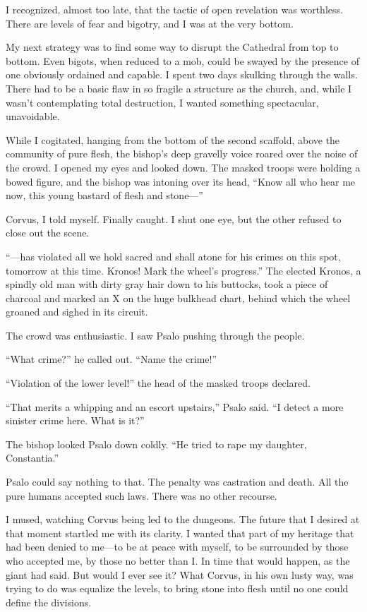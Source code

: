 I recognized, almost too late, that the tactic of open revelation was worthless. There are levels of fear and bigotry, and I was at the very bottom.

My next strategy was to find some way to disrupt the Cathedral from top to bottom. Even bigots, when reduced to a mob, could be swayed by the presence of one obviously ordained and capable. I spent two days skulking through the walls. There had to be a basic flaw in so fragile a structure as the church, and, while I wasn't contemplating total destruction, I wanted something spectacular, unavoidable.

While I cogitated, hanging from the bottom of the second scaffold, above the community of pure flesh, the bishop's deep gravelly voice roared over the noise of the crowd. I opened my eyes and looked down. The masked troops were holding a bowed figure, and the bishop was intoning over its head, ``Know all who hear me now, this young bastard of flesh and stone—''

Corvus, I told myself. Finally caught. I shut one eye, but the other refused to close out the scene.

``—has violated all we hold sacred and shall atone for his crimes on this spot, tomorrow at this time. Kronos! Mark the wheel's progress.'' The elected Kronos, a spindly old man with dirty gray hair down to his buttocks, took a piece of charcoal and marked an X on the huge bulkhead chart, behind which the wheel groaned and sighed in its circuit.

The crowd was enthusiastic. I saw Psalo pushing through the people.

``What crime?'' he called out. ``Name the crime!''

``Violation of the lower level!'' the head of the masked troops declared.

``That merits a whipping and an escort upstairs,'' Psalo said. ``I detect a more sinister crime here. What is it?''

The bishop looked Psalo down coldly. ``He tried to rape my daughter, Constantia.''

Psalo could say nothing to that. The penalty was castration and death. All the pure humans accepted such laws. There was no other recourse.

I mused, watching Corvus being led to the dungeons. The future that I desired at that moment startled me with its clarity. I wanted that part of my heritage that had been denied to me—to be at peace with myself, to be surrounded by those who accepted me, by those no better than I. In time that would happen, as the giant had said. But would I ever see it? What Corvus, in his own lusty way, was trying to do was equalize the levels, to bring stone into flesh until no one could define the divisions.

